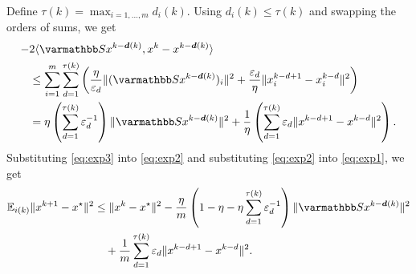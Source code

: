 \documentclass[10pt,mathserif]{beamer}
\begin{document}
\begin{frame}

Define 
$\tau(k) = \max_{i=1,\dots,m} d_i(k)$.
Using $d_i(k)\le \tau(k)$ and swapping the orders of sums, we get
\begin{align}
  - &2\langle \opS x^{k-\vecdelay(k)} ,x^k - x^{k-\vecdelay(k)}\rangle  \nonumber\\
  &\le   \sum_{i=1}^{m} \sum_{d=1}^{{\tau}(k)}\left(\frac{\eta}{\varepsilon_d} \|(\opS  x^{k-\vecdelay(k)})_i\|^2 + \frac{\varepsilon_d}{\eta}\|{x}_i^{k-d+1}-{x}_i^{k-d}\|^2 \right) \nonumber \\
  &=\eta\left(\sum_{d=1}^{{\tau}(k)}\varepsilon_d^{-1}\right)\|\opS x^{k-\vecdelay(k)}\|^2 + \frac{1}{\eta}\left(\sum_{d=1}^{{\tau}(k)}\varepsilon_d \|x^{k-d+1}-x^{k-d}\|^2 \right). \label{eq:exp3}
\end{align}
Substituting \eqref{eq:exp3} into \eqref{eq:exp2} and substituting \eqref{eq:exp2} into \eqref{eq:exp1}, we get
\begin{align}
  \EE_{i(k)}\|x^{k+1} - x^\star\|^2 & \le \|x^k - x^\star\|^2 -
 \frac{\eta}{m}\left(1-\eta -\eta\sum_{d=1}^{{\tau}(k)}\varepsilon_d^{-1}\right)
  \|\opS x^{k-\vecdelay(k)}\|^2 \nonumber\\
  &\quad+ \frac{1}{m}\sum_{d=1}^{{\tau}(k)}\varepsilon_d \|x^{k-d+1}-x^{k-d}\|^2.\label{eq:EEkineq}
\end{align}

\end{frame}
\end{document}
